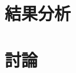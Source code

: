 \section{結果分析}
\subsection{}
\subsection{}
\subsection{}

\section{討論}
\subsection{}
\subsection{}
\subsection{}